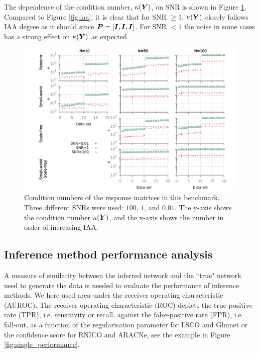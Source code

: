 The dependence of the condition number, \(\kappa({\boldsymbol{Y}})\), on SNR is shown in Figure \ref{fig:k-data}.
Compared to Figure \ref{fig:iaa}, it is clear that for SNR \(\geq 1\), \(\kappa({\boldsymbol{Y}})\) closely follows IAA degree as it should since \({\boldsymbol{P}} = [{\boldsymbol{I}}, {\boldsymbol{I}}, {\boldsymbol{I}}]\). For SNR  \(< 1\) the noise in some cases has a strong effect on \(\kappa({\boldsymbol{Y}})\) as expected.

\begin{figure}[!htb]
\centering
\includegraphics[width=.7\linewidth]{img/data_condition}
\captionsetup{width=.7\textwidth}
\caption{Condition numbers of the response matrices in this benchmark. Three different SNRs were used: $100$, $1$, and $0.01$.  The y-axis shows the condition number $\kappa({\boldsymbol{Y}})$, and the x-axis shows the number in order of increasing IAA.}
\label{fig:k-data}
\end{figure}

\subsection{Inference method performance analysis}
\label{sec:analysis-results}
A measure of similarity between the inferred network and the ``true" network used to generate the data is needed to evaluate the performance of inference methods.
We here used area under the receiver operating characteristic (AUROC). 
The receiver operating characteristic (ROC) depicts the true-positive rate (TPR), i.e. sensitivity or recall, against the false-positive rate (FPR), i.e. fall-out, as a function of the regularisation parameter for LSCO and Glmnet or the confidence score for RNICO and ARACNe, see the example in Figure \ref{fig:single_performance}.%


